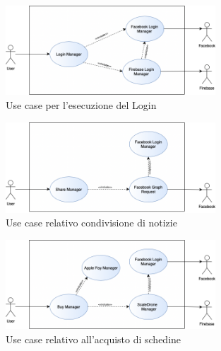 \documentclass[numbers=noenddot, 12pt, a4paper, oneside]{scrbook}
\begin{document}
\begin{figure}[H]
	\centering
	\includegraphics[width=0.7\textwidth]{images/Login}
	\caption{Use case per l'esecuzione del Login}
\end{figure}
\begin{figure}[H]
	\centering
	\includegraphics[width=0.7\textwidth]{images/Share}
	\caption{Use case relativo condivisione di notizie}
\end{figure}
\begin{figure}[H]
	\centering
	\includegraphics[width=0.7\textwidth]{images/Buy}
	\caption{Use case relativo all'acquisto di schedine}
\end{figure}
\end{document}
